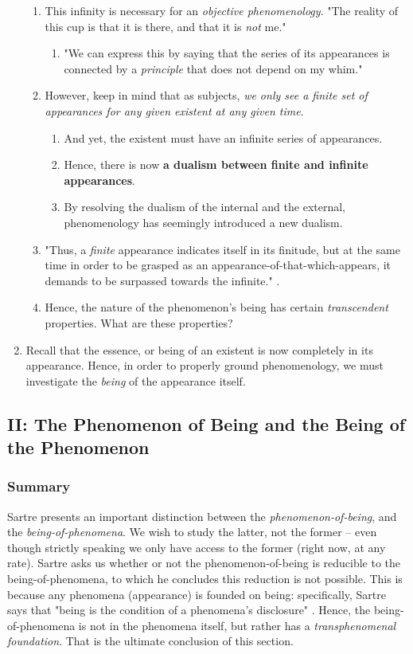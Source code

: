 \begin{enumerate}
\begin{enumerate}
    \item This infinity is necessary for an \emph{objective phenomenology}. "The reality of this cup is that it is there, and that it is \emph{not} me." \autocite[4]{sartre}
    \begin{enumerate}
      \item "We can express this by saying that the series of its appearances is connected by a \emph{principle} that does not depend on my whim." \autocite[4]{sartre}
    \end{enumerate}
    \item However, keep in mind that as subjects, \emph{we only see a finite set of appearances for any given existent at any given time}.
    \begin{enumerate}
      \item And yet, the existent must have an infinite series of appearances.
      \item Hence, there is now \textbf{a dualism between finite and infinite appearances}.
      \item By resolving the dualism of the internal and the external, phenomenology has seemingly introduced a new dualism.
    \end{enumerate}
    \item "Thus, a \emph{finite} appearance indicates itself in its finitude, but at the same time in order to be grasped as an appearance-of-that-which-appears, it demands to be surpassed towards the infinite." \autocite[4]{sartre}.
    \item Hence, the nature of the phenomenon's being has certain \emph{transcendent} properties. What are these properties?
  \end{enumerate}
  \item Recall that the essence, or being of an existent is now completely in its appearance. Hence, in order to properly ground phenomenology, we must investigate the \emph{being} of the appearance itself.
\end{enumerate}

\subsection{II: The Phenomenon of Being and the Being of the Phenomenon}

\subsubsection*{Summary}
Sartre presents an important distinction between the \emph{phenomenon-of-being}, and the \emph{being-of-phenomena}. We wish to study the latter, not the former -- even though strictly speaking we only have access to the former (right now, at any rate). Sartre asks us whether or not the phenomenon-of-being is reducible to the being-of-phenomena, to which he concludes this reduction is not possible. This is because any phenomena (appearance) is founded on being: specifically, Sartre says that "being is the condition of a phenomena's disclosure" \autocite[7]{sartre}. Hence, the being-of-phenomena is not in the phenomena itself, but rather has a \emph{transphenomenal foundation}. That is the ultimate conclusion of this section.

